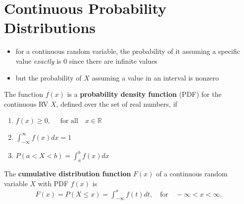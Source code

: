 \documentclass[10pt]{article}
\begin{document}
\section{Continuous Probability Distributions}
\begin{itemize}
    \item for a continuous random variable, the probability of it assuming a specific value \textit{exactly} is 0 since there are infinite values
    \item but the probability of $X$ assuming a value in an interval is nonzero
\end{itemize}
\begin{definition}
    The function $f(x)$ is a \textbf{probability density function} (PDF) for the continuous RV $X$, defined over the set of real numbers, if 
    \begin{enumerate}
        \item $f(x) \ge 0, \quad \text{ for all} \quad x \in \mathbb{R}$
        \item $\int_{-\infty}^{\infty} f(x) dx = 1 $
        \item $P(a<X<b) = \int_{a}^{b} f(x) dx $
    \end{enumerate}
\end{definition} 
\begin{definition}
    The \textbf{cumulative distribution function} $F(x)$ of a continuous random variable $X$ with PDF $f(x)$ is
    \begin{align*}
        F(x) = P(X \le x) = \int_{-\infty}^{x} f(t) dt, \quad \text{for} \quad -\infty < x < \infty
    .\end{align*}
\end{definition}
\end{document}
